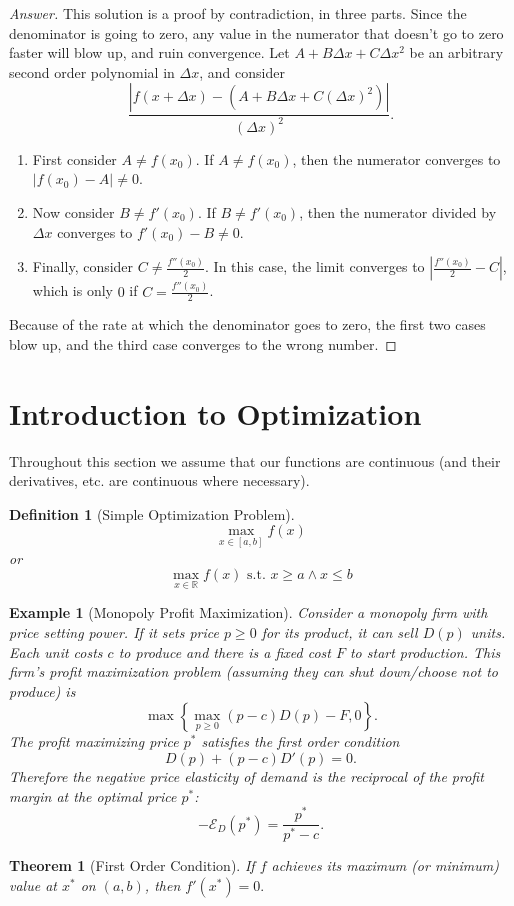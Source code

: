\documentclass[11pt]{article}
\newtheorem*{definition}{Definition}
\newtheorem*{example}{Example}
\newtheorem*{theorem}{Theorem}
\newcommand{\R}{\mathbb{R}}
\begin{document}
\begin{proof}[Answer]
This solution is a proof by contradiction, in three parts. Since the denominator is going to zero, any value in the numerator that doesn't go to zero faster will blow up, and ruin convergence. Let $A + B\Delta x + C \Delta x^2$ be an arbitrary second order polynomial in $\Delta x$, and consider
\[
\frac{|f(x + \Delta x) - \left(A + B \Delta x + C (\Delta x)^2\right)|}{(\Delta x)^2}.
\]
\begin{enumerate}
\item First consider $A \ne f(x_0)$. If $A \ne f(x_0)$, then the numerator converges to $|f(x_0) - A| \ne 0$.
\item Now consider $B \ne f'(x_0)$. If $B \ne f'(x_0)$, then the numerator divided by $\Delta x$ converges to $f'(x_0) - B \ne 0$.
\item Finally, consider $C \ne \frac{f''(x_0)}{2}$. In this case, the limit converges to $\left|\frac{f''(x_0)}{2} - C\right|$, which is only $0$ if $C = \frac{f''(x_0)}{2}$.
\end{enumerate}
Because of the rate at which the denominator goes to zero, the first two cases blow up, and the third case converges to the wrong number.
\end{proof}
\section{Introduction to Optimization}
\label{sec:org4ec8ec7}
Throughout this section we assume that our functions are continuous (and their derivatives, etc. are continuous where necessary).
\begin{definition}[Simple Optimization Problem]
\[
\max_{x \in [a, b]} f(x)
\]
or
\[
\max_{x \in \R} f(x) \text{ s.t. } x \ge a \land x \le b
\]
\end{definition}

\begin{example}[Monopoly Profit Maximization]
Consider a monopoly firm with price setting power. If it sets price $p \ge 0$ for its product, it can sell $D(p)$ units. Each unit costs $c$ to produce and there is a fixed cost $F$ to start production. This firm's profit maximization problem (assuming they can shut down/choose not to produce) is 
\[
\max \left\{\max_{p \ge 0}(p - c)D(p) - F, 0\right\}.
\]
The profit maximizing price $p^*$ satisfies the first order condition
\[
D(p) + (p - c)D'(p) = 0.
\]
Therefore the negative price elasticity of demand is the reciprocal of the profit margin at the optimal price $p^*$:
\[
-\mathcal{E}_D(p^*) = \frac{p^*}{p^* - c}.
\]
\end{example}
\begin{theorem}[First Order Condition]
If $f$ achieves its maximum (or minimum) value at $x^*$ on $(a, b)$, then $f'(x^*) = 0.$
\end{theorem}
\end{document}
